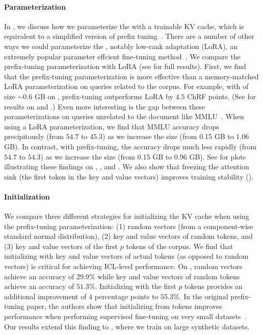 \paragraph{\artifact Parameterization} In , we discuss how we parameterize the \artifact with a trainable KV cache, which is equivalent to a simplified version of prefix tuning~\cite{li2021prefix}.
There are a number of other ways we could parameterize the \artifact, notably low-rank adaptation (LoRA), an extremely popular parameter effcient fine-tuning method~\cite{hu2022lora}.
We compare the prefix-tuning parameterization with LoRA (see  for full results).
First, we find that the prefix-tuning parameterization is more effective than a memory-matched LoRA parameterization on queries related to the corpus. For example, with \artifacts of size $\sim0.6$ GB on \mtob, prefix-tuning outperforms LoRA by $4.5$ ChRF points. (See  for results on \longhealth and \qasper.)
Even more interesting is the gap between these parameterizations on queries unrelated to the document like MMLU~\cite{hendrycks2020measuring}.
When using a LoRA parameterization, we find that MMLU accuracy drops precipitously (from $54.7$ to $45.3$) as we increase the \artifact size (from 0.15 GB to 1.06 GB). In contrast, with prefix-tuning, the accuracy drops much less rapidly (from $54.7$ to $54.3$) as we increase the size (from 0.15 GB to 0.96 GB).
See  for plots illustrating these findings on \longhealth, \qasper, and \mtob.
We also show that freezing the attention sink (the first token in the key and value vectors) improves training stability ().
\paragraph{\artifact Initialization} We compare three different strategies for initializing the KV cache when using the prefix-tuning parameterization: (1) random vectors (from a component-wise standard normal distribution), (2) key and value vectors of random tokens, and (3) key and value vectors of the first $p$ tokens of the corpus.
We find that initializing with key and value vectors of actual tokens (as opposed to random vectors) is critical for achieving ICL-level performance.
On \longhealth, random vectors achieve an accuracy of $29.9\%$ while key and value vectors of random tokens achieve an accuracy of $51.3\%$.
Initializing with the first $p$ tokens provides an additional improvement of $4$ percentage points to $55.3\%$.
In the original prefix-tuning paper, the authors show that initializing from tokens improves performance when performing supervised fine-tuning on very small datasets~\cite{li2021prefix}. Our results extend this finding to \method, where we train on large synthetic datasets.
